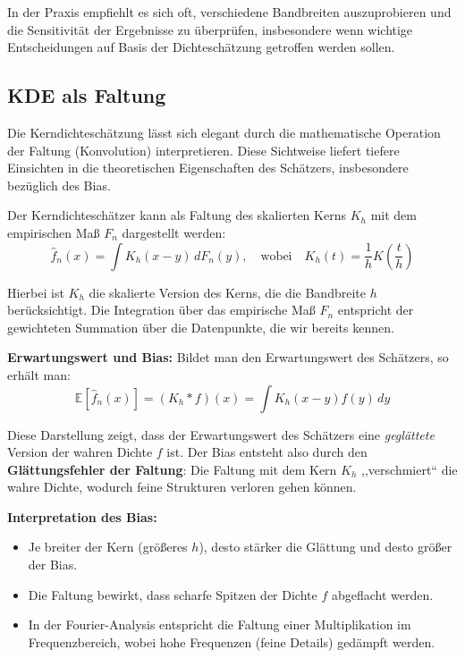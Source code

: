 \documentclass[a4paper, 11pt]{scrartcl}
\begin{document}
In der Praxis empfiehlt es sich oft, verschiedene Bandbreiten auszuprobieren und die Sensitivität der Ergebnisse zu überprüfen, insbesondere wenn wichtige Entscheidungen auf Basis der Dichteschätzung getroffen werden sollen.

\subsection{KDE als Faltung}

Die Kerndichteschätzung lässt sich elegant durch die mathematische Operation der Faltung (Konvolution) interpretieren. Diese Sichtweise liefert tiefere Einsichten in die theoretischen Eigenschaften des Schätzers, insbesondere bezüglich des Bias.

Der Kerndichteschätzer kann als Faltung des skalierten Kerns $K_h$ mit dem empirischen Maß $F_n$ dargestellt werden:
\begin{equation}
	\hat{f}_n(x) = \int K_h(x-y)\,dF_n(y),
	\quad\text{wobei}\quad
	K_h(t) = \frac{1}{h} K\left(\frac{t}{h}\right)
\end{equation}

Hierbei ist $K_h$ die skalierte Version des Kerns, die die Bandbreite $h$ berücksichtigt. Die Integration über das empirische Maß $F_n$ entspricht der gewichteten Summation über die Datenpunkte, die wir bereits kennen.

\textbf{Erwartungswert und Bias:} Bildet man den Erwartungswert des Schätzers, so erhält man:
\begin{equation}
	\mathbb{E}[\hat{f}_n(x)] = (K_h * f)(x) = \int K_h(x-y) f(y)\,dy
\end{equation}

Diese Darstellung zeigt, dass der Erwartungswert des Schätzers eine \textit{geglättete} Version der wahren Dichte $f$ ist. Der Bias entsteht also durch den \textbf{Glättungsfehler der Faltung}: Die Faltung mit dem Kern $K_h$ ,,verschmiert`` die wahre Dichte, wodurch feine Strukturen verloren gehen können.

\textbf{Interpretation des Bias:} 
\begin{itemize}
	\item Je breiter der Kern (größeres $h$), desto stärker die Glättung und desto größer der Bias.
	\item Die Faltung bewirkt, dass scharfe Spitzen der Dichte $f$ abgeflacht werden.
	\item In der Fourier-Analysis entspricht die Faltung einer Multiplikation im Frequenzbereich, wobei hohe Frequenzen (feine Details) gedämpft werden.
\end{itemize}
\end{document}
